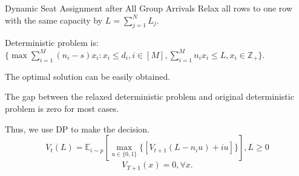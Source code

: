       \begin{frame}{Dynamic Seat Assignment after All Group Arrivals}
        Relax all rows to one row with the same capacity by $L = \sum_{j=1}^{N} L_j$.
        
        Deterministic problem is: $\{\max \sum_{i=1}^{M} (n_i- s) x_{i}: x_{i} \leq d_{i}, i \in [M], \sum_{i=1}^{M} n_{i} x_{i} \leq L, x_{i} \in \mathbb{Z}_{+}\}$.
        
        The optimal solution can be easily obtained. 

        The gap between the relaxed deterministic problem and original deterministic problem is zero for most cases. 

        Thus, we use DP to make the decision.
        $$V_{t}(L) = \mathbb{E}_{i \sim p} [\max_{u \in \{0,1\}} \{ {[V_{t+1}(L-n_i u)+ i u]}\}], L \geq 0$$ 
        $$V_{T+1}(x) =0, \forall x.$$
        

      \end{frame}
      